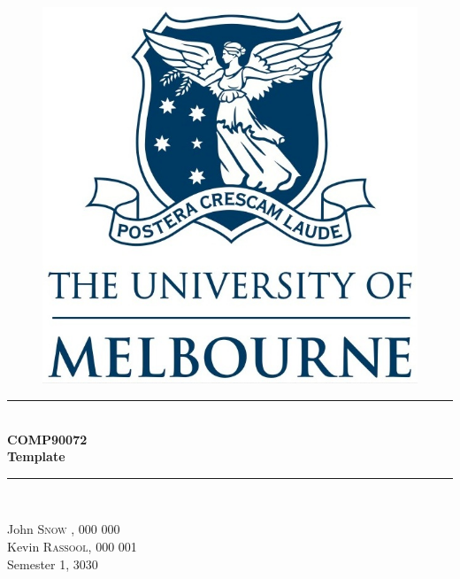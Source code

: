 
\begin{titlepage}
\begin{center}
% 
\begin{figure}[t]
  \centering
\includegraphics[scale=.3]{i/arms.jpg}\\[1cm]
\end{figure}
%
\newcommand{\HRule}{\rule{\linewidth}{0.6mm}}
\HRule \\[1cm]
{ \LARGE\bfseries COMP90072}      \\[0.5cm]
{ \large\bfseries  Template} \\[0.5cm]
\HRule \\[1cm]

\vfill
\begin{center} \Large \end{center}
John     \textsc{Snow}  ,        000 000 \\ [0.5cm]
Kevin       \textsc{Rassool},       000 001 \\ [0.5cm]

{\large Semester 1, 3030}\\ 

\end{center}
\end{titlepage}